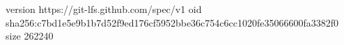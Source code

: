 version https://git-lfs.github.com/spec/v1
oid sha256:c7bd1e5e9b1b7d52f9ed176cf5952bbe36c754c6cc1020fe35066600fa3382f0
size 262240
